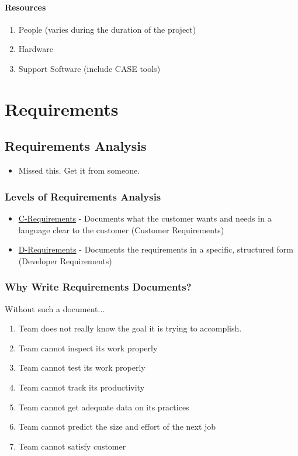 \documentclass{report}
\begin{document}
				\subsubsection{Resources}
					\begin{enumerate}
						\item People (varies during the duration of the project)
						\item Hardware
						\item Support Software (include CASE tools)
					\end{enumerate}
	\chapter{Requirements}
		\section{Requirements Analysis}
			\begin{itemize}
				\item Missed this. Get it from someone.
			\end{itemize}
			\subsection{Levels of Requirements Analysis}
				\begin{itemize}
					\item \underline{C-Requirements} - Documents what the customer wants and needs in a language clear to the customer (Customer Requirements)
					\item \underline{D-Requirements} - Documents the requirements in a specific, structured form (Developer Requirements)
				\end{itemize}
			\subsection{Why Write Requirements Documents?}
				Without such a document...
				\begin{enumerate}
					\item Team does not really know the goal it is trying to accomplish.
					\item Team cannot inspect its work properly
					\item Team cannot test its work properly
					\item Team cannot track its productivity
					\item Team cannot get adequate data on its practices
					\item Team cannot predict the size and effort of the next job
					\item Team cannot satisfy customer
				\end{enumerate}
\end{document}

